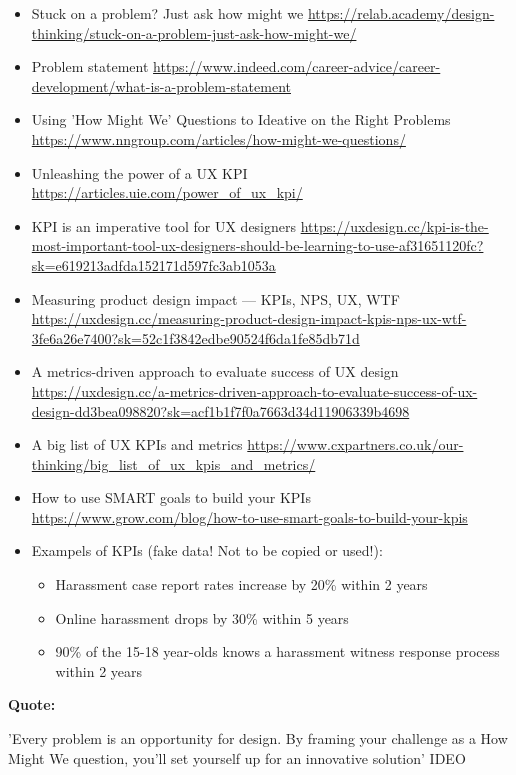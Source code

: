 \begin{itemize}
\item Stuck on a problem? Just ask how might we \url{https://relab.academy/design-thinking/stuck-on-a-problem-just-ask-how-might-we/}
\item Problem statement \url{https://www.indeed.com/career-advice/career-development/what-is-a-problem-statement}
\item Using 'How Might We' Questions to Ideative on the Right Problems \url{https://www.nngroup.com/articles/how-might-we-questions/}
\item Unleashing the power of a UX KPI \url{https://articles.uie.com/power_of_ux_kpi/}
\item KPI is an imperative tool for UX designers \url{https://uxdesign.cc/kpi-is-the-most-important-tool-ux-designers-should-be-learning-to-use-af31651120fc?sk=e619213adfda152171d597fc3ab1053a}
\item Measuring product design impact  ---  KPIs, NPS, UX, WTF \url{https://uxdesign.cc/measuring-product-design-impact-kpis-nps-ux-wtf-3fe6a26e7400?sk=52c1f3842edbe90524f6da1fe85db71d}
\item A metrics-driven approach to evaluate success of UX design \url{https://uxdesign.cc/a-metrics-driven-approach-to-evaluate-success-of-ux-design-dd3bea098820?sk=acf1b1f7f0a7663d34d11906339b4698}
\item A big list of UX KPIs and metrics \url{https://www.cxpartners.co.uk/our-thinking/big_list_of_ux_kpis_and_metrics/}
\item How to use SMART goals to build your KPIs \url{https://www.grow.com/blog/how-to-use-smart-goals-to-build-your-kpis}
\item Exampels of KPIs (fake data! Not to be copied or used!): 
\begin{itemize}
\item Harassment case report rates increase by 20\% within 2 years
\item Online harassment drops by 30\% within 5 years
\item 90\% of the 15-18 year-olds knows a harassment witness response process within 2 years
\end{itemize}
\end{itemize}

\textbf{Quote:}

'Every problem is an opportunity for design. By framing your challenge as a How Might We question, you'll set yourself up for an innovative solution' IDEO

